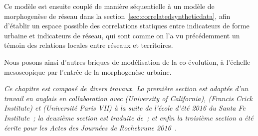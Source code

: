 Ce modèle est ensuite couplé de manière séquentielle à un modèle de morphogenèse de réseau dans la section~\ref{sec:correlatedsyntheticdata}, afin d'établir un espace possible des correlations statiques entre indicateurs de forme urbaine et indicateurs de réseau, qui sont comme on l'a vu précédemment un témoin des relations locales entre réseaux et territoires.


Nous posons ainsi d'autres briques de modélisation de la co-évolution, à l'échelle mesoscopique par l'entrée de la morphogenèse urbaine.




\stars


\textit{Ce chapitre est composé de divers travaux. La première section est adaptée d'un travail en anglais en collaboration avec  (University of California),  (Francis Crick Institute) et  (Université Paris VII) à la suite de l'école d'été 2016 du Santa Fe Institute~\cite{antelope2016interdisciplinary}; la deuxième section est traduite de~\cite{raimbault2017calibration}; et enfin la troisième section a été écrite pour les Actes des Journées de Rochebrune 2016~\cite{raimbault2016generation}.}















